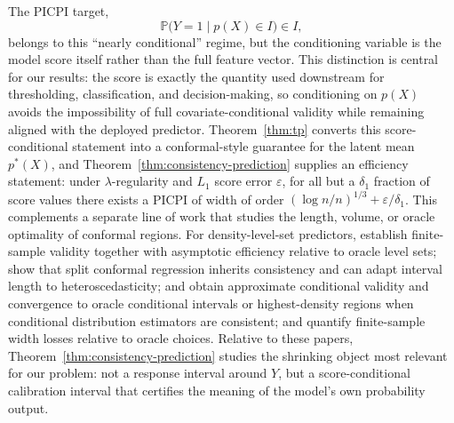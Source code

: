 \documentclass[11pt]{article}
\theoremstyle{statplain}
\theoremstyle{statdefinition}
\newcommand{\0}{\mathbf{0}}
\newcommand{\titleShort}{PICPI\xspace}
\begin{document}
The \titleShort target,
\[
\mathbb{P}\Big(Y=1 \mid p(X)\in I\Big)\in I,
\]
belongs to this ``nearly conditional'' regime, but the conditioning variable is the model score itself rather than the full feature vector. This distinction is central for our results: the score is exactly the quantity used downstream for thresholding, classification, and decision-making, so conditioning on $p(X)$ avoids the impossibility of full covariate-conditional validity while remaining aligned with the deployed predictor. Theorem~\ref{thm:tp} converts this score-conditional statement into a conformal-style guarantee for the latent mean $p^\ast(X)$, and Theorem~\ref{thm:consistency-prediction} supplies an efficiency statement: under $\lambda$-regularity and $L_1$ score error $\varepsilon$, for all but a $\delta_1$ fraction of score values there exists a \titleShort of width of order $(\log n/n)^{1/3}+\varepsilon/\delta_1$. This complements a separate line of work that studies the length, volume, or oracle optimality of conformal regions. For density-level-set predictors, \citet{lei2013distribution} establish finite-sample validity together with asymptotic efficiency relative to oracle level sets; \citet{lei2018distribution} show that split conformal regression inherits consistency and can adapt interval length to heteroscedasticity; \citet{chernozhukov2021distributional} and \citet{izbicki2020flexible,izbicki2022cdsplit} obtain approximate conditional validity and convergence to oracle conditional intervals or highest-density regions when conditional distribution estimators are consistent; and \citet{yang2025selection,lebars2025volume} quantify finite-sample width losses relative to oracle choices. Relative to these papers, Theorem~\ref{thm:consistency-prediction} studies the shrinking object most relevant for our problem: not a response interval around $Y$, but a score-conditional calibration interval that certifies the meaning of the model's own probability output.
\end{document}
